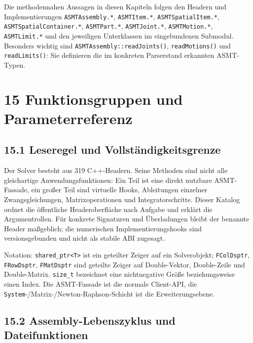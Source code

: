 \documentclass[
  12pt
]{book}
\begin{document}
Die methodennahen Aussagen in diesen Kapiteln folgen den Headern und
Implementierungen \texttt{ASMTAssembly.*}, \texttt{ASMTItem.*},
\texttt{ASMTSpatialItem.*}, \texttt{ASMTSpatialContainer.*},
\texttt{ASMTPart.*}, \texttt{ASMTJoint.*}, \texttt{ASMTMotion.*},
\texttt{ASMTLimit.*} und den jeweiligen Unterklassen im eingebundenen
Submodul. Besonders wichtig sind \texttt{ASMTAssembly::readJoints()},
\texttt{readMotions()} und \texttt{readLimits()}: Sie definieren die im
konkreten Parserstand erkannten ASMT-Typen.

\hypertarget{kap-api-funktionsgruppen}{%
\chapter{\texorpdfstring{{15} Funktionsgruppen und
Parameterreferenz}{15 Funktionsgruppen und Parameterreferenz}}\label{kap-api-funktionsgruppen}}

\hypertarget{leseregel-und-vollstuxe4ndigkeitsgrenze}{%
\section{\texorpdfstring{{15.1} Leseregel und
Vollständigkeitsgrenze}{15.1 Leseregel und Vollständigkeitsgrenze}}\label{leseregel-und-vollstuxe4ndigkeitsgrenze}}

Der Solver besteht aus 319 C++-Headern. Seine Methoden sind nicht alle
gleichartige Anwendungsfunktionen: Ein Teil ist eine direkt nutzbare
ASMT-Fassade, ein großer Teil sind virtuelle Hooks, Ableitungen
einzelner Zwangsgleichungen, Matrixoperationen und Integratorschritte.
Dieser Katalog ordnet die öffentliche Headeroberfläche nach Aufgabe und
erklärt die Argumentrollen. Für konkrete Signaturen und Überladungen
bleibt der benannte Header maßgeblich; die numerischen
Implementierungshooks sind versionsgebunden und nicht als stabile ABI
zugesagt.

Notation: \texttt{shared\_ptr\textless{}T\textgreater{}} ist ein
geteilter Zeiger auf ein Solverobjekt; \texttt{FColDsptr},
\texttt{FRowDsptr}, \texttt{FMatDsptr} sind geteilte Zeiger auf
Double-Vektor, Double-Zeile und Double-Matrix. \texttt{size\_t}
bezeichnet eine nichtnegative Größe beziehungsweise einen Index. Die
ASMT-Fassade ist die normale Client-API, die
\texttt{System}-/Matrix-/Newton-Raphson-Schicht ist die
Erweiterungsebene.

\hypertarget{assembly-lebenszyklus-und-dateifunktionen}{%
\section{\texorpdfstring{{15.2} Assembly-Lebenszyklus und
Dateifunktionen}{15.2 Assembly-Lebenszyklus und Dateifunktionen}}\label{assembly-lebenszyklus-und-dateifunktionen}}
\end{document}
